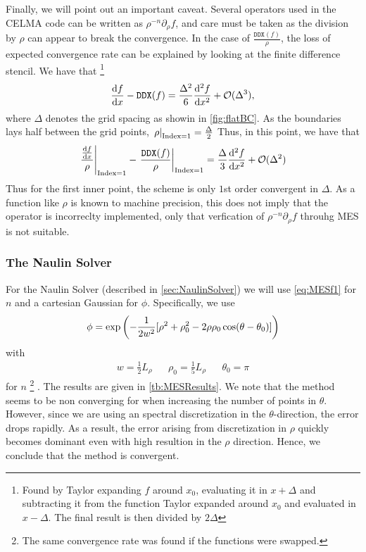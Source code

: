 Finally, we will point out an important caveat.
Several operators used in the CELMA code can be written as $\rho^{-n}\partial_\rho f$, and care must be taken as the division by $\rho$ can appear to break the convergence.
In the case of $\frac{\texttt{DDX}(f)}{\rho}$, the loss of expected convergence rate can be explained by looking at the finite difference stencil.
We have that%
%
\footnote{
Found by Taylor expanding $f$ around $x_0$, evaluating it in $x+\Delta$ and subtracting it from the function Taylor expanded around $x_0$ and evaluated in $x-\Delta$. The final result is then divided by $2\Delta$
}
%
\begin{align*}
    \frac{\text{d}{f}}{\text{d}{x}} - \texttt{DDX}(f) =
    \frac{\Delta^2}{6}\frac{\text{d}{^2f}}{\text{d}{x^2}} + \mathcal{O}(\Delta^3),
\end{align*}
%
where $\Delta$ denotes the grid spacing as showin in \cref{fig:flatBC}.
As the boundaries lays half between the grid points, $\left.\rho\right|_{\text{Index}=1}=\frac{\Delta}{2}$
Thus, in this point, we have that
%
\begin{align*}
    \left.\frac{\frac{\text{d}{f}}{\text{d}{x}}}{\rho}\right|_{\text{Index}=1}
    - \left.\frac{\texttt{DDX}(f)}{\rho}\right|_{\text{Index}=1}
    = \frac{\Delta}{3}\frac{\text{d}{^2f}}{\text{d}{x^2}} + \mathcal{O}(\Delta^2)
\end{align*}
%
Thus for the first inner point, the scheme is only $1$st order convergent in $\Delta$.
As a function like $\rho$ is known to machine precision, this does not imply that the operator is incorreclty implemented, only that verfication of $\rho^{-n}\partial_\rho f$ throuhg MES is not suitable.

\subsubsection{The Naulin Solver}
%
For the Naulin Solver (described in \cref{sec:NaulinSolver}) we will use \cref{eq:MESf1} for $n$ and a cartesian Gaussian for $\phi$.
Specifically, we use
%
\begin{align}
\phi = \exp\left(-\frac{1}{2w^2}[\rho^2 + \rho_0^2 - 2\rho\rho_0\cos(\theta - \theta_0)] \right)
\label{eq:MESf2}
\end{align}
%
with
%
\begin{align*}
& w = \frac{1}{2}L_\rho &
& \rho_0 = \frac{1}{5}L_\rho &
& \theta_0 = \pi &
\end{align*}
%
for $n$%
\footnote{The same convergence rate was found if the functions were swapped.}%
.
The results are given in \cref{tb:MESResults}.
We note that the method seems to be non converging for when increasing the number of points in $\theta$.
However, since we are using an spectral discretization in the $\theta$-direction, the error drops rapidly.
As a result, the error arising from discretization in $\rho$ quickly becomes dominant even with high resultion in the $\rho$ direction.
Hence, we conclude that the method is convergent.

